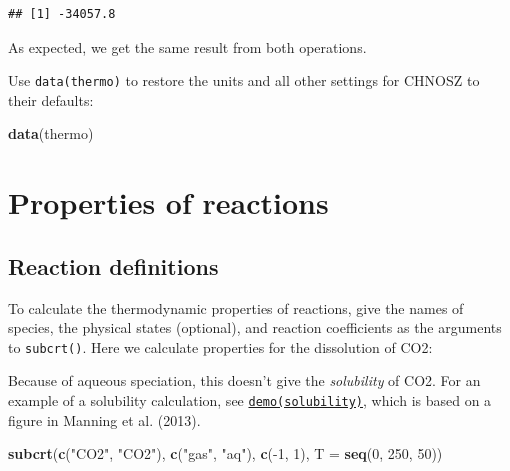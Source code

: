 \documentclass[]{tufte-handout}
\newenvironment{Shaded}{}{}
\newcommand{\KeywordTok}[1]{\textcolor[rgb]{0.00,0.44,0.13}{\textbf{#1}}}
\newcommand{\DataTypeTok}[1]{\textcolor[rgb]{0.56,0.13,0.00}{#1}}
\newcommand{\DecValTok}[1]{\textcolor[rgb]{0.25,0.63,0.44}{#1}}
\newcommand{\StringTok}[1]{\textcolor[rgb]{0.25,0.44,0.63}{#1}}
\newcommand{\OperatorTok}[1]{\textcolor[rgb]{0.40,0.40,0.40}{#1}}
\newcommand{\NormalTok}[1]{#1}
\begin{document}
\begin{Shaded}
\end{Shaded}

\begin{verbatim}
## [1] -34057.8
\end{verbatim}

As expected, we get the same result from both operations.

Use {\texttt{data(thermo)}} to restore the units and all other settings
for CHNOSZ to their defaults:

\begin{Shaded}
\begin{Highlighting}[]
\KeywordTok{data}\NormalTok{(thermo)}
\end{Highlighting}
\end{Shaded}

\hypertarget{properties-of-reactions}{\section{Properties of
reactions}\label{properties-of-reactions}}

\subsection{Reaction definitions}\label{reaction-definitions}

To calculate the thermodynamic properties of reactions, give the names
of species, the physical states (optional), and reaction coefficients as
the arguments to {\texttt{subcrt()}}. Here we calculate properties for
the dissolution of CO2:

\begin{marginfigure}
Because of aqueous speciation, this doesn't give the \emph{solubility}
of CO2. For an example of a solubility calculation, see
\href{../demo}{{\texttt{demo(solubility)}}}, which is based on a figure
in Manning et al. (2013).
\end{marginfigure}

\begin{Shaded}
\begin{Highlighting}[]
\KeywordTok{subcrt}\NormalTok{(}\KeywordTok{c}\NormalTok{(}\StringTok{"CO2"}\NormalTok{, }\StringTok{"CO2"}\NormalTok{), }\KeywordTok{c}\NormalTok{(}\StringTok{"gas"}\NormalTok{, }\StringTok{"aq"}\NormalTok{), }\KeywordTok{c}\NormalTok{(}\OperatorTok{-}\DecValTok{1}\NormalTok{, }\DecValTok{1}\NormalTok{), }\DataTypeTok{T =} \KeywordTok{seq}\NormalTok{(}\DecValTok{0}\NormalTok{, }\DecValTok{250}\NormalTok{, }\DecValTok{50}\NormalTok{))}
\end{Highlighting}
\end{Shaded}
\end{document}

